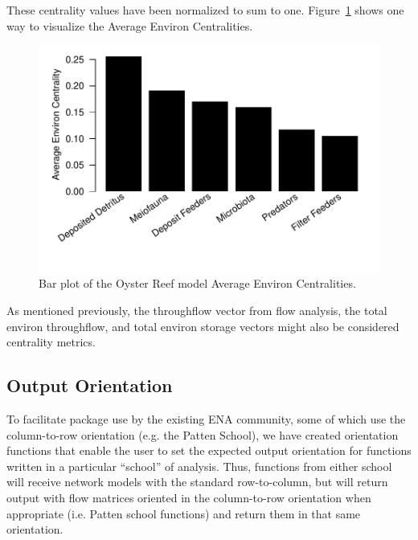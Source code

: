 \documentclass[article]{jss}
\begin{document}
These centrality values have been normalized to sum to
one. Figure~\ref{fig:aec} shows one way to visualize the Average
Environ Centralities.


\begin{Schunk}
\end{Schunk}

\begin{figure}
  \center
\includegraphics{enaR-vignette-043}
\caption{Bar plot of the Oyster Reef model Average Environ
  Centralities.} \label{fig:aec}
\end{figure}

As mentioned previously, the throughflow vector from flow analysis,
the total environ throughflow, and total environ storage vectors might
also be considered centrality metrics.

\subsection{Output Orientation}  \label{sec:orient}

To facilitate package use by the existing ENA community, some of which
use the column-to-row orientation (e.g. the Patten School), we have
created orientation functions that enable the user to set the expected
output orientation for functions written in a particular ``school'' of
analysis. Thus, functions from either school will receive network
models with the standard row-to-column, but will return output with
flow matrices oriented in the column-to-row orientation when
appropriate (i.e. Patten school functions) and return them in that
same orientation.
\end{document}
